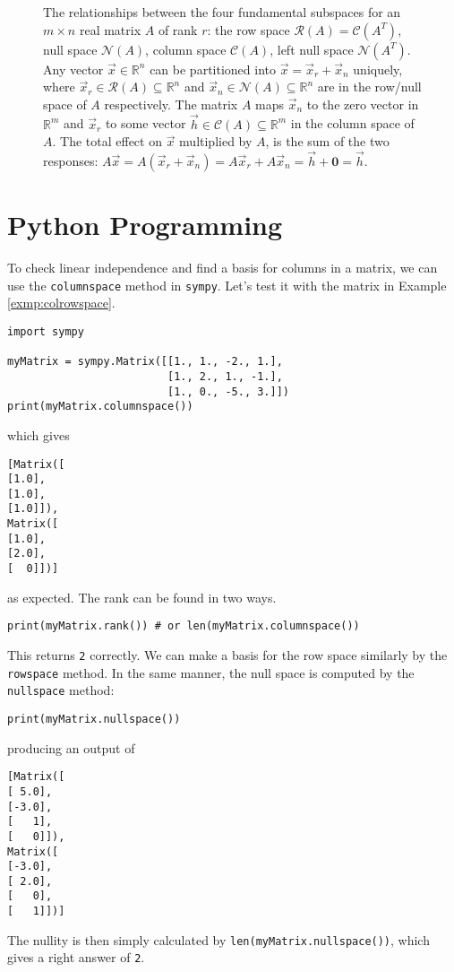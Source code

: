 \begin{figure}
    \caption{The relationships between the four fundamental subspaces for an $m \times n$ real matrix $A$ of rank $r$: the row space $\mathcal{R}(A) = \mathcal{C}(A^T)$, null space $\mathcal{N}(A)$, column space $\mathcal{C}(A)$, left null space $\mathcal{N}(A^T)$. Any vector $\vec{x} \in \mathbb{R}^n$ can be partitioned into $\vec{x} = \vec{x}_r + \vec{x}_n$ uniquely, where $\vec{x}_r \in \mathcal{R}(A) \subseteq \mathbb{R}^n$ and $\vec{x}_n \in \mathcal{N}(A) \subseteq \mathbb{R}^n$ are in the row/null space of $A$ respectively. The matrix $A$ maps $\vec{x}_n$ to the zero vector in $\mathbb{R}^m$ and $\vec{x}_r$ to some vector $\vec{h} \in \mathcal{C}(A) \subseteq \mathbb{R}^m$ in the column space of $A$. The total effect on $\vec{x}$ multiplied by $A$, is the sum of the two responses: $A\vec{x} = A(\vec{x}_r + \vec{x}_n) = A\vec{x}_r + A\vec{x}_n = \vec{h} + \textbf{0} = \vec{h}$.}
    \label{fig:foursubspaces}
\end{figure}

\section{Python Programming}
To check linear independence and find a basis for columns in a matrix, we can use the \verb|columnspace| method in \verb|sympy|. Let's test it with the matrix in Example \ref{exmp:colrowspace}.
\begin{lstlisting}
import sympy

myMatrix = sympy.Matrix([[1., 1., -2., 1.],
                         [1., 2., 1., -1.],
                         [1., 0., -5., 3.]])
print(myMatrix.columnspace())
\end{lstlisting}
which gives
\begin{lstlisting}
[Matrix([        
[1.0],
[1.0],
[1.0]]), 
Matrix([
[1.0],
[2.0],
[  0]])]   
\end{lstlisting}
as expected. The rank can be found in two ways.
\begin{lstlisting}
print(myMatrix.rank()) # or len(myMatrix.columnspace())
\end{lstlisting}
This returns \verb|2| correctly. We can make a basis for the row space similarly by the \verb|rowspace| method. In the same manner, the null space is computed by the \verb|nullspace| method:
\begin{lstlisting}
print(myMatrix.nullspace())
\end{lstlisting}
producing an output of
\begin{lstlisting}
[Matrix([
[ 5.0],
[-3.0],
[   1],
[   0]]), 
Matrix([
[-3.0],
[ 2.0],
[   0],
[   1]])]
\end{lstlisting}
The nullity is then simply calculated by \verb|len(myMatrix.nullspace())|, which gives a right answer of \verb|2|.

